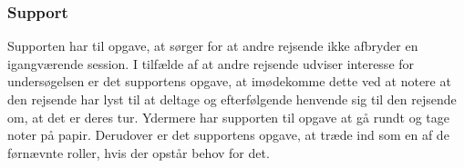 \subsubsection*{Support}
Supporten har til opgave, at sørger for at andre rejsende ikke afbryder en igangværende session. I tilfælde af at andre rejsende udviser interesse for undersøgelsen er det supportens opgave, at imødekomme dette ved at notere at den rejsende har lyst til at deltage og efterfølgende henvende sig til den rejsende om, at det er deres tur. Ydermere har supporten til opgave at gå rundt og tage noter på papir. Derudover er det supportens opgave, at træde ind som en af de førnævnte roller, hvis der opstår behov for det.  


